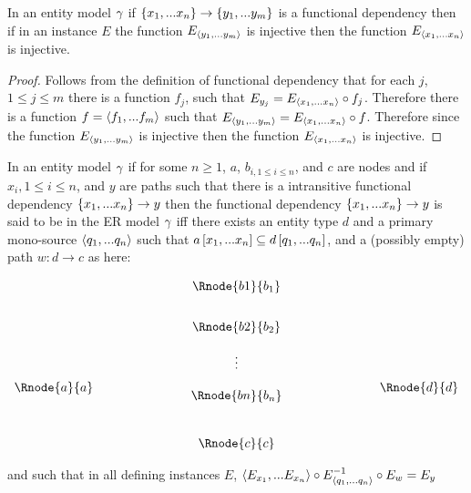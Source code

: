 \begin{lemma}
In an entity model $\gamma$ if $\left\{x_1,...x_n\right\} \rightarrow \left\{y_1,...y_{m}\right\}$ is a functional dependency then if in an instance $E$ the function $E_{\langle y_1,...y_{m}\rangle}$ is injective then the function $E_{\langle x_1,...x_n\rangle}$  is injective.
\end{lemma}
\begin{proof}
Follows from the definition of functional dependency that for each $j$, $1 \leq j \leq m$  there is a function ${f_j}$,  such that
$E_{y_j}=E_{\langle x_1,...x_n\rangle}\circ f_j$. Therefore there is a function $f=\langle f_1,...f_m\rangle$ such that
$E_{\langle y_1,...y_m\rangle}= E_{\langle x_1,...x_n\rangle}\circ f $. Therefore since  the function $E_{\langle y_1,...y_{m}\rangle}$ is 
injective then the function $E_{\langle x_1,...x_n\rangle}$  is injective.
\end{proof}

\begin{definition}
\noindent In an entity model $\gamma$  
if for some $n \geq 1$, $a$, $b_{i, 1 \leq i \leq n}$,  and $c$ are nodes and 
if  $x_{i}, 1 \leq i \leq n$, and $y$ are paths such
that there is a intransitive functional dependency $\{x_1,...x_n\} \rightarrow y$
 then the functional dependency $\{x_1,...x_n\} \rightarrow y$ is said to be  in the ER model $\gamma$ iff  there exists an entity type $d$ and a primary mono-source
$\langle q_1,...q_n\rangle$  such that $a\left[x_1,...x_n\right]\subseteq d\left[q_1,...q_n\right]$, and a (possibly empty)
path $w:d\rightarrow c$ as here:

\setlength{\arraycolsep}{.2cm}
\begin{center}
$
\begin{array}{cp{2cm}c p{2cm} c}
             &  & \Rnode{b1}{b_1} & &               \\ [0.7cm]
						 &  & \Rnode{b2}{b_2} & &               \\ [0.4cm]
						 &  &     \vdots      & &               \\ [0.2cm]
\Rnode{a}{a} &  &                 & & \Rnode{d}{d}  \\ [-0.2cm]
             &  & \Rnode{bn}{b_n} & &               \\ [0.9cm]
             &  & \Rnode{c}{c}    & &               \\
\end{array}
$
\end{center}

and such that in all defining instances $E$, 
$\langle E_{x_1},...E_{x_n}\rangle \circ E^{-1}_{\langle q_1,...q_n\rangle}\circ E_w = E_y$
\end{definition}

